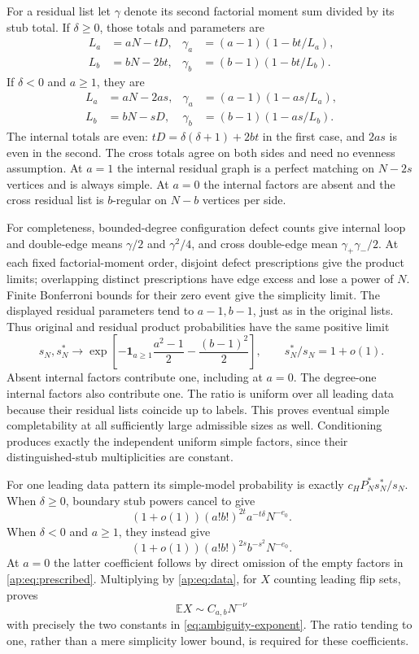 For a residual list let $\gamma$ denote its second factorial moment
sum divided by its stub total. If $\delta\ge0$, those totals and
parameters are
\begin{align*}
 L_a&=aN-tD,&\gamma_a&=(a-1)(1-bt/L_a),\\
 L_b&=bN-2bt,&\gamma_b&=(b-1)(1-bt/L_b).
\end{align*}
If $\delta<0$ and $a\ge1$, they are
\begin{align*}
 L_a&=aN-2as,&\gamma_a&=(a-1)(1-as/L_a),\\
 L_b&=bN-sD,&\gamma_b&=(b-1)(1-as/L_b).
\end{align*}
The internal totals are even: $tD=\delta(\delta+1)+2bt$ in the
first case, and $2as$ is even in the second. The cross totals agree
on both sides and need no evenness assumption. At $a=1$ the internal
residual graph is a perfect matching on $N-2s$ vertices and is always
simple. At $a=0$ the internal factors are absent and the cross
residual list is $b$-regular on $N-b$ vertices per side.

For completeness, bounded-degree configuration defect counts give
internal loop and double-edge means $\gamma/2$ and $\gamma^2/4$,
and cross double-edge mean $\gamma_+\gamma_-/2$. At each fixed
factorial-moment order, disjoint defect prescriptions give the product
limits; overlapping distinct prescriptions have edge excess and lose
a power of $N$. Finite Bonferroni bounds for their zero event give
the simplicity limit. The displayed residual parameters tend to
$a-1,b-1$, just as in the original lists. Thus original and residual
product probabilities have the same positive limit
\begin{equation}\label{ap:eq:simplicity}
 s_N,s_N^*\longrightarrow
 \exp\!\left[-\mathbf1_{a\ge1}\frac{a^2-1}{2}
                         -\frac{(b-1)^2}{2}\right],
 \qquad s_N^*/s_N=1+o(1).
\end{equation}
Absent internal factors contribute one, including at $a=0$.
The degree-one internal factors also contribute one. The ratio is
uniform over all leading data because their residual lists coincide
up to labels. This proves eventual simple completability at all
sufficiently large admissible sizes as well. Conditioning produces
exactly the independent uniform simple factors, since their
distinguished-stub multiplicities are constant.

For one leading data pattern its simple-model probability is exactly
$c_HP_N^*s_N^*/s_N$. When $\delta\ge0$, boundary stub powers cancel
to give
\[
 (1+o(1))(a!b!)^{2t}a^{-t\delta}N^{-e_0}.
\]
When $\delta<0$ and $a\ge1$, they instead give
\[
 (1+o(1))(a!b!)^{2s}b^{-s^2}N^{-e_0}.
\]
At $a=0$ the latter coefficient follows by direct omission of the
empty factors in \eqref{ap:eq:prescribed}. Multiplying by
\eqref{ap:eq:data}, for $X$ counting leading flip sets, proves
\begin{equation}\label{ap:eq:first}
 \mathbb E X\sim C_{a,b}N^{-\nu}
\end{equation}
with precisely the two constants in \eqref{eq:ambiguity-exponent}.
The ratio tending to one, rather than a mere simplicity lower bound,
is required for these coefficients.

